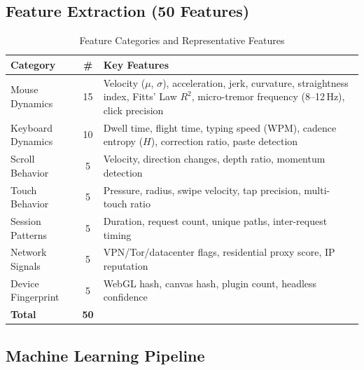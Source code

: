 \documentclass[12pt, a4paper]{article}
\begin{document}
\subsection{Feature Extraction (50 Features)}

\begin{table}[H]
\centering
\caption{Feature Categories and Representative Features}
\label{tab:features}
\small
\begin{tabularx}{\textwidth}{@{}l c X@{}}
\toprule
\textbf{Category} & \textbf{\#} & \textbf{Key Features} \\
\midrule
Mouse Dynamics & 15 & Velocity ($\mu$, $\sigma$), acceleration, jerk, curvature, straightness index, Fitts' Law $R^2$, micro-tremor frequency (8--12\,Hz), click precision \\[2pt]
Keyboard Dynamics & 10 & Dwell time, flight time, typing speed (WPM), cadence entropy ($H$), correction ratio, paste detection \\[2pt]
Scroll Behavior & 5 & Velocity, direction changes, depth ratio, momentum detection \\[2pt]
Touch Behavior & 5 & Pressure, radius, swipe velocity, tap precision, multi-touch ratio \\[2pt]
Session Patterns & 5 & Duration, request count, unique paths, inter-request timing \\[2pt]
Network Signals & 5 & VPN/Tor/datacenter flags, residential proxy score, IP reputation \\[2pt]
Device Fingerprint & 5 & WebGL hash, canvas hash, plugin count, headless confidence \\
\midrule
\textbf{Total} & \textbf{50} & \\
\bottomrule
\end{tabularx}
\end{table}

\subsection{Machine Learning Pipeline}
\end{document}
